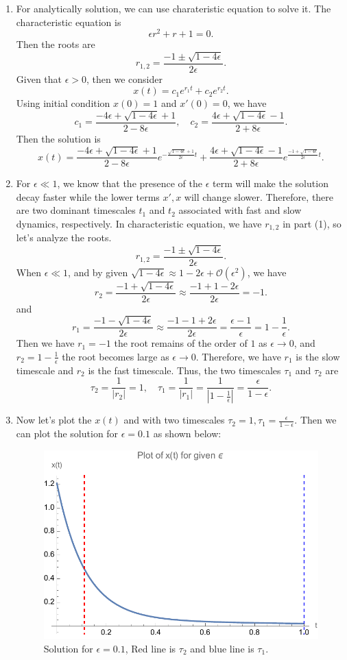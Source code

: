 \documentclass[12pt]{exam}
\newcommand{\BO}{\mathcal{O}}
\begin{document}
\begin{enumerate}
	\item For analytically solution, we can use charateristic equation to solve it. The characteristic equation is
		\[\epsilon r^2+r+1=0.\]
		Then the roots are
		\[r_{1,2}=\frac{-1\pm\sqrt{1-4\epsilon}}{2\epsilon}.\]
		Given that $\epsilon>0$, then we consider
		\[x(t)= c_1e^{r_1t}+c_2e^{r_2t}.\]
		Using initial condition $x(0)=1$ and $x'(0)=0$, we have
		\[c_1 = \frac{-4\epsilon+\sqrt{1-4\epsilon}+1}{2-8\epsilon}, \quad c_2 = \frac{4\epsilon+\sqrt{1-4\epsilon}-1}{2+8\epsilon}.\]
		Then the solution is
		\[x(t)=\frac{-4\epsilon+\sqrt{1-4\epsilon}+1}{2-8\epsilon}e^{-\frac{\sqrt{1-4\epsilon }+1}{2\epsilon}t}+\frac{4\epsilon+\sqrt{1-4\epsilon}-1}{2+8\epsilon}e^{\frac{-1+\sqrt{1-4\epsilon}}{2\epsilon} t}.\]

	\item For $\epsilon \ll 1$, we know that the presence of the $\epsilon$ term will make the solution decay faster while the lower terms $x', x$ will change slower. Therefore, there are two dominant timescales $t_1$ and $t_2$ associated with fast and slow dynamics, respectively.
		In characteristic equation, we have $r_{1,2}$ in part (1), so let's analyze the roots.
		\[r_{1,2}=\frac{-1\pm\sqrt{1-4\epsilon}}{2\epsilon}.\]
		When $\epsilon \ll 1$, and by given $\sqrt{1-4\epsilon}\approx 1-2\epsilon+\BO(\epsilon^2)$, we have
		\[r_2= \frac{-1+\sqrt{1-4\epsilon}}{2\epsilon} \approx \frac{-1+1-2\epsilon}{2\epsilon} = -1.\]
		and
		\[r_1= \frac{-1-\sqrt{1-4\epsilon}}{2\epsilon} \approx \frac{-1-1+2\epsilon}{2\epsilon} = \frac{\epsilon-1}{\epsilon} = 1-\frac{1}{\epsilon}.\]
		Then we have $r_1=-1$ the root remains of the order of $1$ as $\epsilon \to 0$, and $r_2=1-\frac{1}{\epsilon}$ the root becomes large as $\epsilon \to 0$. Therefore, we have $r_1$ is the slow timescale and $r_2$ is the fast timescale.
		Thus, the two timescales $\tau_1$ and $\tau_2$ are
		\[\tau_2 = \frac{1}{|r_2|} = 1, \quad \tau_1 = \frac{1}{|r_1|} = \frac{1}{|1-\frac{1}{\epsilon}|} = \frac{\epsilon}{1-\epsilon}.\]
		
	\item Now let's plot the $x(t)$ and with two timescales $\tau_2=1, \tau_1=\frac{\epsilon}{1-\epsilon}$. Then we can plot the solution for $\epsilon=0.1$ as shown below:
			
				\begin{figure}[H]
					\centering
					\includegraphics[width=0.8\linewidth] {x(t).pdf}
					\caption{Solution for $\epsilon=0.1$, Red line is $\tau_2$ and blue line is $\tau_1$.}
					

\end{figure}
\end{enumerate}
\end{document}
